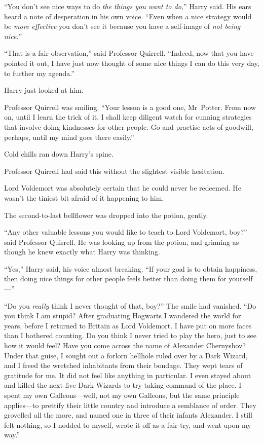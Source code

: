 “You don’t see nice ways to do \emph{the things you want to do,}” Harry said. His ears heard a note of desperation in his own voice. “Even when a nice strategy would be \emph{more effective} you don’t see it because you have a self-image of \emph{not being nice.}”

“That is a fair observation,” said Professor Quirrell. “Indeed, now that you have pointed it out, I have just now thought of some nice things I can do this very day, to further my agenda.”

Harry just looked at him.

Professor Quirrell was smiling. “Your lesson is a good one, Mr~Potter. From now on, until I learn the trick of it, I shall keep diligent watch for cunning strategies that involve doing kindnesses for other people. Go and practise acts of goodwill, perhaps, until my mind goes there easily.”

Cold chills ran down Harry’s spine.

Professor Quirrell had said this without the slightest visible hesitation.

Lord Voldemort was absolutely certain that he could never be redeemed. He wasn’t the tiniest bit afraid of it happening to him.

The second-to-last bellflower was dropped into the potion, gently.

“Any other valuable lessons you would like to teach to Lord Voldemort, boy?” said Professor Quirrell. He was looking up from the potion, and grinning as though he knew exactly what Harry was thinking.

“Yes,” Harry said, his voice almost breaking. “If your goal is to obtain happiness, then doing nice things for other people feels better than doing them for yourself—”

“Do you \emph{really} think I never thought of that, boy?” The smile had vanished. “Do you think I am stupid? After graduating Hogwarts I wandered the world for years, before I returned to Britain as Lord Voldemort. I have put on more faces than I bothered counting. Do you think I never tried to play the hero, just to see how it would feel? Have you come across the name of Alexander Chernyshov? Under that guise, I sought out a forlorn hellhole ruled over by a Dark Wizard, and I freed the wretched inhabitants from their bondage. They wept tears of gratitude for me. It did not feel like anything in particular. I even stayed about and killed the next five Dark Wizards to try taking command of the place. I spent my own Galleons—well, not my own Galleons, but the same principle applies—to prettify their little country and introduce a semblance of order. They grovelled all the more, and named one in three of their infants Alexander. I still felt nothing, so I nodded to myself, wrote it off as a fair try, and went upon my way.”

